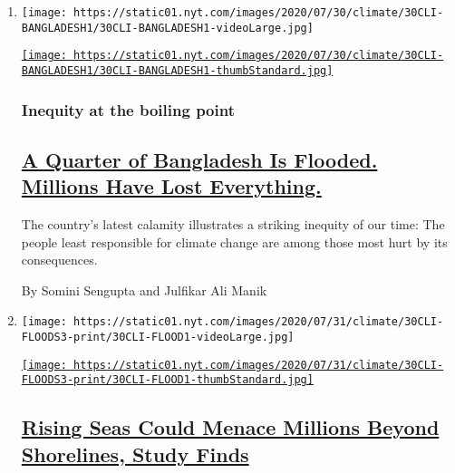 \begin{enumerate}
\def\labelenumi{\arabic{enumi}.}
\item
  \texttt{[image: https://static01.nyt.com/images/2020/07/30/climate/30CLI-BANGLADESH1/30CLI-BANGLADESH1-videoLarge.jpg]}

  \href{/2020/07/30/climate/bangladesh-floods.html}{\texttt{[image: https://static01.nyt.com/images/2020/07/30/climate/30CLI-BANGLADESH1/30CLI-BANGLADESH1-thumbStandard.jpg]}}

  \hypertarget{inequity-at-the-boiling-point}{%
  \subsubsection{Inequity at the boiling
  point}\label{inequity-at-the-boiling-point}}

  \hypertarget{a-quarter-of-bangladesh-is-flooded-millions-have-lost-everything}{%
  \subsection{\texorpdfstring{\href{/2020/07/30/climate/bangladesh-floods.html}{A
  Quarter of Bangladesh Is Flooded. Millions Have Lost
  Everything.}}{A Quarter of Bangladesh Is Flooded. Millions Have Lost Everything.}}\label{a-quarter-of-bangladesh-is-flooded-millions-have-lost-everything}}

  The country's latest calamity illustrates a striking inequity of our
  time: The people least responsible for climate change are among those
  most hurt by its consequences.

  By Somini Sengupta and Julfikar Ali Manik
\item
  \texttt{[image: https://static01.nyt.com/images/2020/07/31/climate/30CLI-FLOODS3-print/30CLI-FLOOD1-videoLarge.jpg]}

  \href{/2020/07/30/climate/sea-level-inland-floods.html}{\texttt{[image: https://static01.nyt.com/images/2020/07/31/climate/30CLI-FLOODS3-print/30CLI-FLOOD1-thumbStandard.jpg]}}

  \hypertarget{rising-seas-could-menace-millions-beyond-shorelines-study-finds}{%
  \subsection{\texorpdfstring{\href{/2020/07/30/climate/sea-level-inland-floods.html}{Rising
  Seas Could Menace Millions Beyond Shorelines, Study
  Finds}}{Rising Seas Could Menace Millions Beyond Shorelines, Study Finds}}\label{rising-seas-could-menace-millions-beyond-shorelines-study-finds}}


\end{enumerate}
